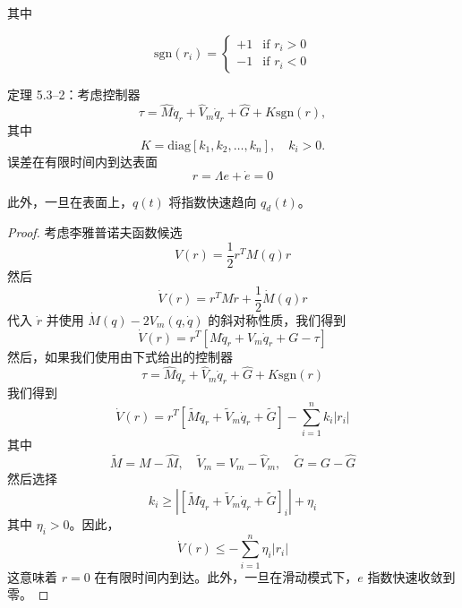 \documentclass[UTF8,12pt,a4paper]{ctexart}
\begin{document}
其中

\begin{equation}
\text{sgn}(r_i) = \begin{cases} +1 & \text{if } r_i > 0 \\ -1 & \text{if } r_i < 0 \end{cases}
\end{equation}

\begin{theorem}\label{thm:5.3.2}
定理 5.3--2：考虑控制器
\begin{equation}
\tau = \hat{M}\ddot{q}_r + \hat{V}_m\dot{q}_r + \hat{G} + K\text{sgn}(r),
\end{equation}
其中
\begin{equation}
K = \text{diag}[k_1, k_2, \ldots, k_n], \quad k_i > 0.
\end{equation}
误差在有限时间内到达表面
\begin{equation}
r = \Lambda e + \dot{e} = 0
\end{equation}

此外，一旦在表面上，$q(t)$ 将指数快速趋向 $q_d(t)$。
\end{theorem}

\begin{proof}
考虑李雅普诺夫函数候选
\begin{equation}
V(r) = \frac{1}{2}r^T M(q)r
\end{equation}
然后
\begin{equation}
\dot{V}(r) = r^T M\dot{r} + \frac{1}{2}\dot{M}(q)r
\end{equation}
代入 $\dot{r}$ 并使用 $\dot{M}(q)-2V_m(q,\dot{q})$ 的斜对称性质，我们得到
\begin{equation}
\dot{V}(r) = r^T[M\ddot{q}_r + V_m\dot{q}_r + G - \tau]
\end{equation}
然后，如果我们使用由下式给出的控制器
\begin{equation}
\tau = \hat{M}\ddot{q}_r + \hat{V}_m\dot{q}_r + \hat{G} + K \text{sgn}(r)
\end{equation}
我们得到
\begin{equation}
\dot{V}(r) = r^T[\tilde{M}\ddot{q}_r + \tilde{V}_m\dot{q}_r + \tilde{G}] - \sum_{i=1}^{n}k_i|r_i|
\end{equation}
其中
\begin{equation}
\tilde{M} = M - \hat{M}, \quad \tilde{V}_m = V_m - \hat{V}_m, \quad \tilde{G} = G - \hat{G}
\end{equation}
然后选择
\begin{equation}
k_i \geq |[\tilde{M}\ddot{q}_r + \tilde{V}_m\dot{q}_r + \tilde{G}]_i| + \eta_i
\end{equation}
其中 $\eta_i > 0$。因此，
\begin{equation}
\dot{V}(r) \leq -\sum_{i=1}^{n}\eta_i|r_i|
\end{equation}
这意味着 $r = 0$ 在有限时间内到达。此外，一旦在滑动模式下，$e$ 指数快速收敛到零。
\end{proof}
\end{document}
